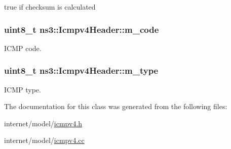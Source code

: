 true if checksum is calculated 

\subsubsection[{\texorpdfstring{m\+\_\+code}{m_code}}]{\setlength{\rightskip}{0pt plus 5cm}uint8\+\_\+t ns3\+::\+Icmpv4\+Header\+::m\+\_\+code\hspace{0.3cm}{\ttfamily [private]}}\hypertarget{classns3_1_1Icmpv4Header_a5ec86b8745c4ea8bb3cae7304d53711f}{}\label{classns3_1_1Icmpv4Header_a5ec86b8745c4ea8bb3cae7304d53711f}


I\+C\+MP code. 

\subsubsection[{\texorpdfstring{m\+\_\+type}{m_type}}]{\setlength{\rightskip}{0pt plus 5cm}uint8\+\_\+t ns3\+::\+Icmpv4\+Header\+::m\+\_\+type\hspace{0.3cm}{\ttfamily [private]}}\hypertarget{classns3_1_1Icmpv4Header_a7c62b0fd585e2d7380414dfd6535d0d4}{}\label{classns3_1_1Icmpv4Header_a7c62b0fd585e2d7380414dfd6535d0d4}


I\+C\+MP type. 



The documentation for this class was generated from the following files\+:\begin{DoxyCompactItemize}
\item 
internet/model/\hyperlink{icmpv4_8h}{icmpv4.\+h}\item 
internet/model/\hyperlink{icmpv4_8cc}{icmpv4.\+cc}\end{DoxyCompactItemize}

